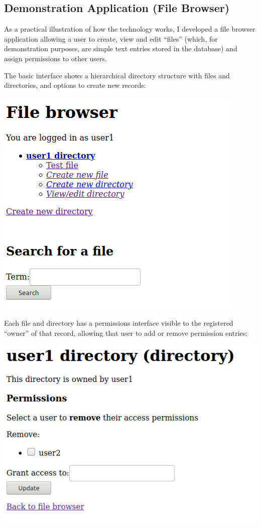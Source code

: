 \documentclass[12pt]{report}
\begin{document}
\subsection{Demonstration Application (File Browser)}
As a practical illustration of how the technology works, I developed a file browser application allowing a user to create, view and edit ``files'' (which, for demonstration purposes, are simple text entries stored in the database) and assign permissions to other users.

The basic interface shows a hierarchical directory structure with files and directories, and options to create new records:

\begin{center}
  \includegraphics[scale=0.5]{05-browser1.png}
\end{center}

Each file and directory has a permissions interface visible to the registered ``owner'' of that record, allowing that user to add or remove permission entries:

\begin{center}
  \includegraphics[scale=0.5]{06-browser2-perms.png}
\end{center}
\end{document}

